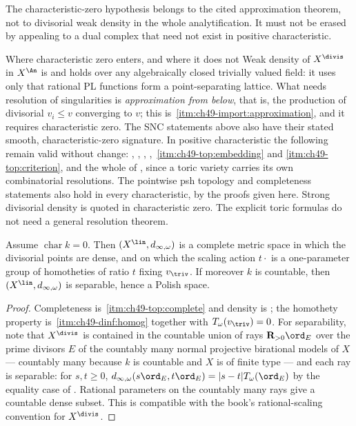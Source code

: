The characteristic-zero hypothesis belongs to the cited approximation
theorem, not to divisorial weak density in the whole analytification.  It
must not be erased by appealing to a dual complex that need not exist in
positive characteristic.

\begin{warning}{Where characteristic zero enters, and where it does not}
\label{warn:ch49-characteristic}
Weak density of $X^{\divis}$ in $X^{\An}$ is
 and holds over any algebraically closed
trivially valued field: it uses only that rational PL functions form a
point-separating lattice.  What needs resolution of singularities is
\emph{approximation from below}, that is, the production of divisorial
$v_i\le v$ converging to $v$; this is
\,\cref{itm:ch49-import:approximation}, and it requires characteristic zero.  The SNC statements above
also have their stated smooth, characteristic-zero signature.  In
positive characteristic the following remain valid without change:
,
,
,
,
\,\cref{itm:ch49-top:embedding} and
\cref{itm:ch49-top:criterion}, and the whole of
, since a toric variety carries its
own combinatorial resolutions.  The pointwise psh topology and completeness statements also hold in
every characteristic, by the proofs given here.  Strong divisorial density
is quoted in characteristic zero.  The explicit toric formulas do not
need a general resolution theorem.
\end{warning}

\begin{corollary}
\label{cor:ch49-separable}
Assume $\operatorname{char}k=0$.  Then
$(X^{\lin},d_{\infty,\omega})$ is a complete metric space in which the
divisorial points are dense, and on which the scaling action
$t\cdot$ is a one-parameter group of homotheties of ratio $t$ fixing
$v_{\triv}$.  If moreover $k$ is countable, then
$(X^{\lin},d_{\infty,\omega})$ is separable, hence a Polish space.
\end{corollary}

\begin{proof}
Completeness is
\,\cref{itm:ch49-top:complete} and
density is ; the homothety property
is \,\cref{itm:ch49-dinf:homog} together with
$T_\omega(v_{\triv})=0$.  For separability, note that
$X^{\divis}$ is contained in the countable union of rays
$\mathbf R_{>0}\ord_E$ over
the prime divisors $E$ of the countably many normal projective
birational models of $X$ --- countably many because $k$ is countable
and $X$ is of finite type --- and each ray is separable: for $s,t\ge0$,
$d_{\infty,\omega}(s\ord_E,t\ord_E)=|s-t|T_\omega(\ord_E)$ by the
equality case of .
Rational parameters on the countably many rays give a countable
dense subset.  This is compatible with the book's rational-scaling
convention for $X^{\divis}$.
\end{proof}

